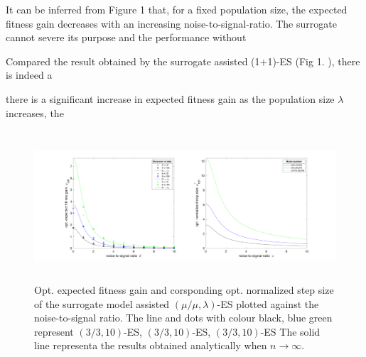 It can be inferred from Figure 1 that, for a fixed population size, the expected fitness gain decreases with an increasing noise-to-signal-ratio. The surrogate cannot severe its purpose and the performance without 

Compared the result obtained by the surrogate assisted (1+1)-ES (Fig 1. \cite{DBLP:conf/ppsn/KayhaniA18}), there is indeed a 

there is a significant increase in expected fitness gain as the population size $\lambda$ increases, the 




\begin{center}
\begin{figure}
\includegraphics[height=2.2in, width=5.4in]{opt_stepSize_fitGain}
\caption{Opt. expected fitness gain and corsponding opt. normalized step size of the surrogate model assisted $(\mu/\mu,\lambda)$-ES plotted against the noise-to-signal ratio. The line and dots with colour black, blue green represent $(3/3,10)$-ES, $(3/3,10)$-ES, $(3/3,10)$-ES The solid line representa the results obtained analytically when $n\rightarrow \infty$. }
\end{figure}
\end{center}

